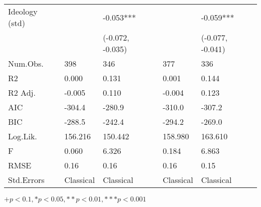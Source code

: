 \begin{table}[th!]
\begin{threeparttable}
\begin{tabular}{lC{3cm}C{3cm}C{3cm}C{3cm}}
 Ideology (std) &                 &               -0.053*** &                 &                -0.059*** \\
                &                 &        (-0.072, -0.035) &                 &         (-0.077, -0.041) \\
       Num.Obs. &             398 &                     346 &             377 &                      336 \\
             R2 &           0.000 &                   0.131 &           0.001 &                    0.144 \\
        R2 Adj. &          -0.005 &                   0.110 &          -0.004 &                    0.123 \\
            AIC &          -304.4 &                  -280.9 &          -310.0 &                   -307.2 \\
            BIC &          -288.5 &                  -242.4 &          -294.2 &                   -269.0 \\
       Log.Lik. &         156.216 &                 150.442 &         158.980 &                  163.610 \\
              F &           0.060 &                   6.326 &           0.184 &                    6.863 \\
           RMSE &            0.16 &                    0.16 &            0.16 &                     0.15 \\
     Std.Errors &       Classical &               Classical &       Classical &                Classical \\
\bottomrule
\end{tabular}
\begin{tablenotes}
\item \footnotesize $+ p < 0.1, * p < 0.05, ** p < 0.01, *** p < 0.001$
\end{tablenotes}
\end{threeparttable}
\end{table}
